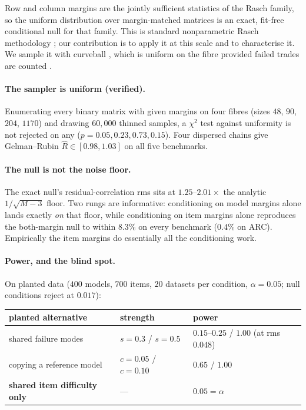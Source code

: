 \documentclass[10pt,letterpaper]{article}
\begin{document}
Row and column margins are the jointly sufficient statistics of the Rasch family, so the uniform
distribution over margin-matched matrices is an exact, fit-free conditional null for that family.
This is standard nonparametric Rasch methodology \citep{ponocny2001,verhelst2008}; our
contribution is to apply it at this scale and to characterise it. We sample it with curveball
\citep{strona2014}, which is uniform on the fibre provided failed trades are counted
\citep{carstens2015}.

\paragraph{The sampler is uniform (verified).} Enumerating every binary matrix with given margins
on four fibres (sizes $48$, $90$, $204$, $1170$) and drawing $60{,}000$ thinned samples, a $\chi^2$
test against uniformity is not rejected on any ($p=0.05,0.23,0.73,0.15$). Four dispersed chains
give Gelman--Rubin $\hat R\in[0.98,1.03]$ on all five benchmarks.

\paragraph{The null is not the noise floor.} The exact null's residual-correlation rms sits at
$1.25$--$2.01\times$ the analytic $1/\sqrt{M-3}$ floor. Two rungs are informative: conditioning on
model margins alone lands exactly \emph{on} that floor, while conditioning on item margins alone
reproduces the both-margin null to within $8.3\%$ on every benchmark ($0.4\%$ on ARC). Empirically
the item margins do essentially all the conditioning work.

\paragraph{Power, and the blind spot.} On planted data ($400$ models, $700$ items, $20$ datasets
per condition, $\alpha=0.05$; null conditions reject at $0.017$):

\begin{center}\small
\begin{tabular}{lll}
\toprule
planted alternative & strength & power \\
\midrule
shared failure modes & $s=0.3$ / $s=0.5$ & $0.15$--$0.25$ / $\mathbf{1.00}$ (at rms $0.048$) \\
copying a reference model & $c=0.05$ / $c=0.10$ & $0.65$ / $\mathbf{1.00}$ \\
\textbf{shared item difficulty only} & --- & $\mathbf{0.05}=\alpha$ \\
\bottomrule
\end{tabular}
\end{center}
\end{document}
